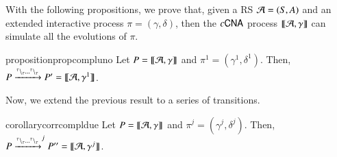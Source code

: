 With the following propositions, we prove that, given a RS ${\cal A} = (S, A)$ and an extended  interactive process $\pi=(\gamma,\delta)$, then the $c\textsf{CNA}$ process $\llbracket{\cal A},\gamma\rrbracket$ can simulate all the evolutions  of $\pi$. 

 \begin{restatable}[Completeness 1]{proposition}{propcompluno} 
 \label{prop:compl1}
Let   $P=\llbracket{\cal A},\gamma\rrbracket$ and $\pi^1 = (\gamma^1,\delta^1)$.
Then, 
  $P \xrightarrow{{}^{\tau} \backslash_{\tau}\dots {}^{\tau} \backslash_{\tau}} P'=\llbracket{\cal A},\gamma^1\rrbracket$.
\end{restatable}

\noindent
Now, we extend the previous result to a series of transitions.
 
\begin{restatable}[Completeness 2]{corollary}{corrcompldue} 
 \label{corr:compl2}
Let $P=\llbracket{\cal A},\gamma\rrbracket$ and  $\pi^j= (\gamma^j,\delta^j)$.  
Then, $P \xrightarrow{{}^{\tau} \backslash_{\tau}\dots{}^{\tau} \backslash_{\tau}}^j P''=\llbracket{\cal A},\gamma^j\rrbracket$.  
 \end{restatable}




 
% 
 
 
 
 
  